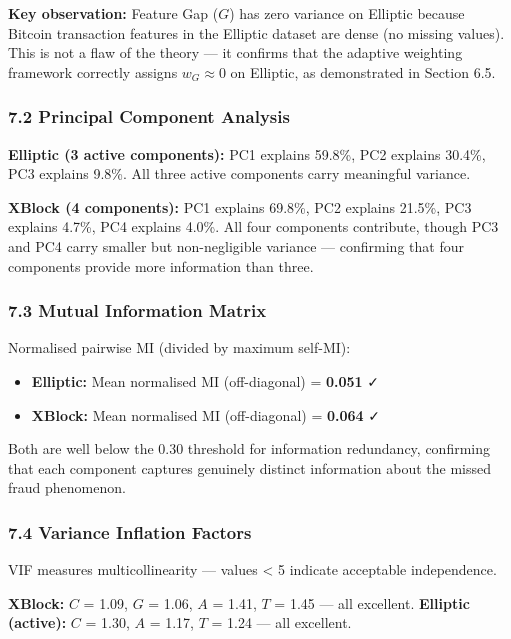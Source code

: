 \documentclass[
  11pt,
]{article}
\providecommand{\tightlist}{%
  \setlength{\itemsep}{0pt}\setlength{\parskip}{0pt}}
\begin{document}
\textbf{Key observation:} Feature Gap (\(G\)) has zero variance on
Elliptic because Bitcoin transaction features in the Elliptic dataset
are dense (no missing values). This is not a flaw of the theory — it
confirms that the adaptive weighting framework correctly assigns
\(w_G \approx 0\) on Elliptic, as demonstrated in Section 6.5.

\subsubsection{7.2 Principal Component
Analysis}\label{principal-component-analysis}

\textbf{Elliptic (3 active components):} PC1 explains 59.8\%, PC2
explains 30.4\%, PC3 explains 9.8\%. All three active components carry
meaningful variance.

\textbf{XBlock (4 components):} PC1 explains 69.8\%, PC2 explains
21.5\%, PC3 explains 4.7\%, PC4 explains 4.0\%. All four components
contribute, though PC3 and PC4 carry smaller but non-negligible variance
— confirming that four components provide more information than three.

\subsubsection{7.3 Mutual Information
Matrix}\label{mutual-information-matrix}

Normalised pairwise MI (divided by maximum self-MI):

\begin{itemize}
\tightlist
\item
  \textbf{Elliptic:} Mean normalised MI (off-diagonal) = \textbf{0.051}
  ✓
\item
  \textbf{XBlock:} Mean normalised MI (off-diagonal) = \textbf{0.064} ✓
\end{itemize}

Both are well below the 0.30 threshold for information redundancy,
confirming that each component captures genuinely distinct information
about the missed fraud phenomenon.

\subsubsection{7.4 Variance Inflation
Factors}\label{variance-inflation-factors}

VIF measures multicollinearity — values \textless{} 5 indicate
acceptable independence.

\textbf{XBlock:} \(C\) = 1.09, \(G\) = 1.06, \(A\) = 1.41, \(T\) = 1.45
— all excellent. \textbf{Elliptic (active):} \(C\) = 1.30, \(A\) = 1.17,
\(T\) = 1.24 — all excellent.
\end{document}
